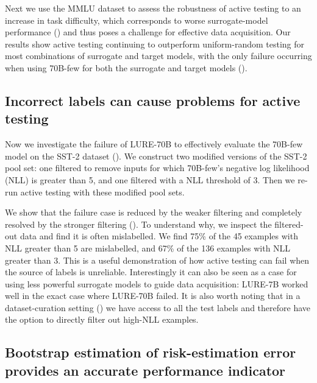 Next we use the MMLU dataset to assess the robustness of active testing to an increase in task difficulty, which corresponds to worse surrogate-model performance () and thus poses a challenge for effective data acquisition.
Our results show active testing continuing to outperform uniform-random testing for most combinations of surrogate and target models, with the only failure occurring when using 70B-few for both the surrogate and target models ().






\subsection{Incorrect labels can cause problems for active testing}\label{sec:failure}

Now we investigate the failure of LURE-70B to effectively evaluate the 70B-few model on the SST-2 dataset ().
We construct two modified versions of the SST-2 pool set: one filtered to remove inputs for which 70B-few's negative log likelihood (NLL) is greater than 5, and one filtered with a NLL threshold of 3.
Then we re-run active testing with these modified pool sets.

We show that the failure case is reduced by the weaker filtering and completely resolved by the stronger filtering ().
To understand why, we inspect the filtered-out data and find it is often mislabelled.
We find 75\% of the 45 examples with NLL greater than 5 are mislabelled, and 67\% of the 136 examples with NLL greater than 3.
This is a useful demonstration of how active testing can fail when the source of labels is unreliable.
Interestingly it can also be seen as a case for using less powerful surrogate models to guide data acquisition: LURE-7B worked well in the exact case where LURE-70B failed.
It is also worth noting that in a dataset-curation setting () we have access to all the test labels and therefore have the option to directly filter out high-NLL examples.





\subsection{Bootstrap estimation of risk-estimation error provides an accurate performance indicator}\label{sec:boot}

